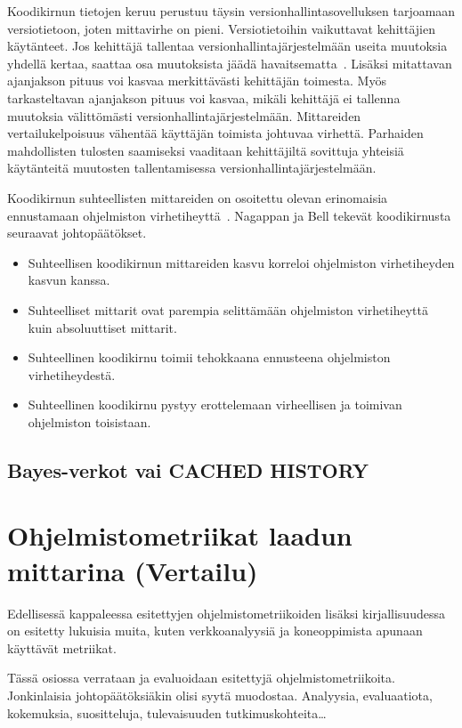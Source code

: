 \documentclass[finnish]{tktltiki2}
\theoremstyle{definition}
\theoremstyle{remark}
\begin{document}
Koodikirnun tietojen keruu perustuu täysin versionhallintasovelluksen tarjoamaan versiotietoon, joten mittavirhe on pieni. Versiotietoihin vaikuttavat kehittäjien käytänteet. Jos kehittäjä tallentaa versionhallintajärjestelmään useita muutoksia yhdellä kertaa, saattaa osa muutoksista jäädä havaitsematta~\cite{NB05}. Lisäksi mitattavan ajanjakson pituus voi kasvaa merkittävästi kehittäjän toimesta. Myös tarkasteltavan ajanjakson pituus voi kasvaa, mikäli kehittäjä ei tallenna muutoksia välittömästi versionhallintajärjestelmään. Mittareiden vertailukelpoisuus vähentää käyttäjän toimista johtuvaa virhettä. Parhaiden mahdollisten tulosten saamiseksi vaaditaan kehittäjiltä sovittuja yhteisiä käytänteitä muutosten tallentamisessa versionhallintajärjestelmään.

Koodikirnun suhteellisten mittareiden on osoitettu olevan erinomaisia ennustamaan ohjelmiston virhetiheyttä~\cite{NB05}. Nagappan ja Bell tekevät koodikirnusta seuraavat johtopäätökset.

\begin{itemize}
    \item Suhteellisen koodikirnun mittareiden kasvu korreloi ohjelmiston virhetiheyden kasvun kanssa.
    \item Suhteelliset mittarit ovat parempia selittämään ohjelmiston virhetiheyttä kuin absoluuttiset mittarit.
    \item Suhteellinen koodikirnu toimii tehokkaana ennusteena ohjelmiston virhetiheydestä.
    \item Suhteellinen koodikirnu pystyy erottelemaan virheellisen ja toimivan ohjelmiston toisistaan.
\end{itemize}


\subsection{Bayes-verkot vai CACHED HISTORY}





\section{Ohjelmistometriikat laadun mittarina (Vertailu)}

Edellisessä kappaleessa esitettyjen ohjelmistometriikoiden lisäksi kirjallisuudessa on esitetty lukuisia muita, kuten verkkoanalyysiä ja koneoppimista apunaan käyttävät metriikat.


Tässä osiossa verrataan ja evaluoidaan esitettyjä ohjelmistometriikoita. Jonkinlaisia johtopäätöksiäkin olisi syytä muodostaa. Analyysia, evaluaatiota, kokemuksia, suositteluja, tulevaisuuden tutkimuskohteita\dots
\end{document}
